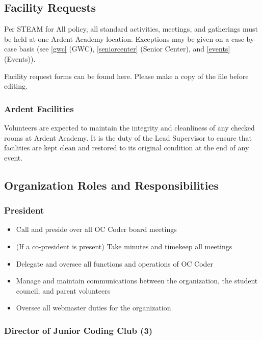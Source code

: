 \documentclass[twoside,11pt,letterpaper,abstracton]{scrartcl}
\begin{document}
\subsection{Facility Requests}

Per STEAM for All policy, all standard activities, meetings, and gatherings must be held at one Ardent Academy location. Exceptions may be given on a case-by-case basis (see \ref{gwc} (GWC), \ref{seniorcenter} (Senior Center), and \ref{events} (Events)).

Facility request forms can be found here. Please make a copy of the file before editing.

\subsubsection{Ardent Facilities}

Volunteers are expected to maintain the integrity and cleanliness of any checked rooms at Ardent Academy. It is the duty of the Lead Supervisor to ensure that facilities are kept clean and restored to its original condition at the end of any event.

\subsection{Organization Roles and Responsibilities}

\subsubsection{President}

\begin{itemize}
    \item Call and preside over all OC Coder board meetings
    \item (If a co-president is present) Take minutes and timekeep all meetings
    \item Delegate and oversee all functions and operations of OC Coder
    \item Manage and maintain communications between the organization, the student council, and parent volunteers
    \item Oversee all webmaster duties for the organization
\end{itemize}

\subsubsection{Director of Junior Coding Club (3)}
\end{document}
